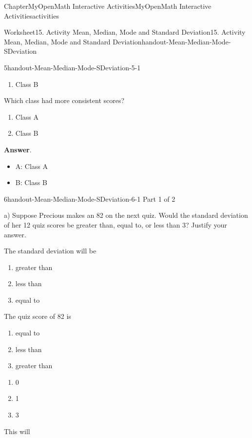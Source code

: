 \documentclass[oneside,10pt,]{book}
\newcommand{\blocktitlefont}{\relax}
\newcommand{\ptxlistdisc}{\raisebox{0.3ex}{\textbullet}}
\begin{document}
\begin{chapterptx}{Chapter}{MyOpenMath Interactive Activities}{}{MyOpenMath Interactive Activities}{}{}{activities}
\begin{worksheet-section}{Worksheet}{15. Activity Mean, Median, Mode and Standard Deviation}{}{15. Activity Mean, Median, Mode and Standard Deviation}{}{}{handout-Mean-Median-Mode-SDeviation}
\begin{divisionexercise}{5}{}{}{handout-Mean-Median-Mode-SDeviation-5-1}
\begin{enumerate}[label={(\alph*)}]
\item{}Class B%
\end{enumerate}
%
\par
Which class had more consistent scores?%
\par
%
\begin{enumerate}[label={(\alph*)}]
\item{}Class A%
\item{}Class B%
\end{enumerate}
%
\par\smallskip%
\noindent\textbf{\blocktitlefont Answer}.\hypertarget{handout-Mean-Median-Mode-SDeviation-5-1-2}{}\quad{}%
\begin{itemize}[label=\ptxlistdisc]
\item{}A: Class A%
\item{}B: Class B%
\end{itemize}
%
\end{divisionexercise}%
\clearpage
\begin{divisionexercise}{6}{}{}{handout-Mean-Median-Mode-SDeviation-6-1}%
Part 1 of 2%
\par
a) Suppose Precious makes an 82 on the next quiz. Would the standard deviation of her 12 quiz scores be greater than, equal to, or less than 3? Justify your answer.%
\par
The standard deviation will be%
\par
%
\begin{enumerate}[label={(\alph*)}]
\item{}greater than%
\item{}less than%
\item{}equal to%
\end{enumerate}
%
\par
The quiz score of 82 is%
\par
%
\begin{enumerate}[label={(\alph*)}]
\item{}equal to%
\item{}less than%
\item{}greater than%
\end{enumerate}
%
\par
%
\begin{enumerate}[label={(\alph*)}]
\item{}0%
\item{}1%
\item{}3%
\end{enumerate}
%
\par
This will%
\par

\end{divisionexercise}
\end{worksheet-section}
\end{chapterptx}
\end{document}
